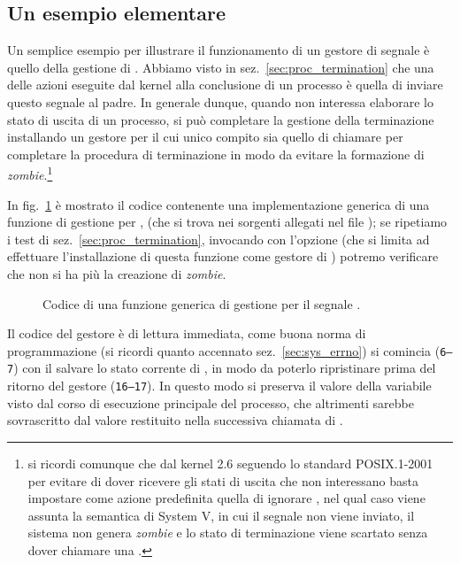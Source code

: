 \subsection{Un esempio elementare}
\label{sec:sig_sigchld}

Un semplice esempio per illustrare il funzionamento di un gestore di segnale è
quello della gestione di . Abbiamo visto in
sez.~\ref{sec:proc_termination} che una delle azioni eseguite dal kernel alla
conclusione di un processo è quella di inviare questo segnale al padre. In
generale dunque, quando non interessa elaborare lo stato di uscita di un
processo, si può completare la gestione della terminazione installando un
gestore per  il cui unico compito sia quello di chiamare
 per completare la procedura di terminazione in modo da evitare
la formazione di \textit{zombie}.\footnote{si ricordi comunque che dal kernel
  2.6 seguendo lo standard POSIX.1-2001 per evitare di dover ricevere gli
  stati di uscita che non interessano basta impostare come azione predefinita
  quella di ignorare , nel qual caso viene assunta la
  semantica di System V, in cui il segnale non viene inviato, il sistema non
  genera \textit{zombie} e lo stato di terminazione viene scartato senza dover
  chiamare una .}

In fig.~\ref{fig:sig_sigchld_handl} è mostrato il codice contenente una
implementazione generica di una funzione di gestione per ,
(che si trova nei sorgenti allegati nel file ); se ripetiamo i
test di sez.~\ref{sec:proc_termination}, invocando  con
l'opzione  (che si limita ad effettuare l'installazione di questa
funzione come gestore di ) potremo verificare che non si ha
più la creazione di \textit{zombie}.

\begin{figure}[!htbp]
  \footnotesize  \centering
  \begin{minipage}[c]{\codesamplewidth}
  \end{minipage}
  \normalsize 
  \caption{Codice di una funzione generica di gestione per il segnale
    .}
  \label{fig:sig_sigchld_handl}
\end{figure}

Il codice del gestore è di lettura immediata, come buona norma di
programmazione (si ricordi quanto accennato sez.~\ref{sec:sys_errno}) si
comincia (\texttt{\small 6--7}) con il salvare lo stato corrente di
, in modo da poterlo ripristinare prima del ritorno del gestore
(\texttt{\small 16--17}). In questo modo si preserva il valore della variabile
visto dal corso di esecuzione principale del processo, che altrimenti sarebbe
sovrascritto dal valore restituito nella successiva chiamata di
.


